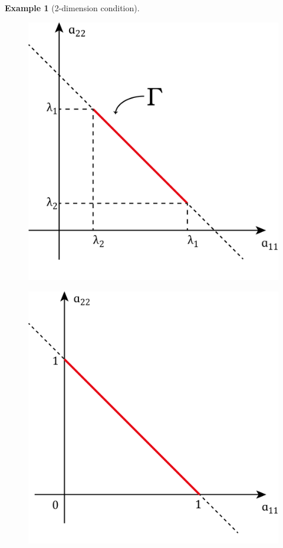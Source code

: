 \documentclass[11pt]{amsart}
\numberwithin{equation}{section}
\theoremstyle{plain}
\newtheorem{eg}[theorem]{Example}
\theoremstyle{plain}
\numberwithin{equation}{section}
\theoremstyle{remark}
\begin{document}
\begin{eg}[2-dimension condition]
\begin{figure}[th]
\begin{minipage}[t]{.49\textwidth}
		\centering
		\includegraphics[width=.95\textwidth]{figures/figure1.png}\\
		\caption{}
		\label{fig3}
	\end{minipage}
	\begin{minipage}[t]{.49\textwidth}
		\centering
		\includegraphics[width=.95\textwidth]{figures/figure2.png}\\

\end{minipage}
\end{figure}
\end{eg}
\end{document}
